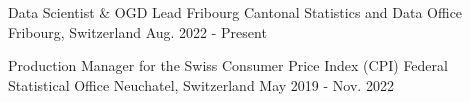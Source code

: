 
\begin{cventries}
  \cventry
    {Data Scientist \& OGD Lead}
    {Fribourg Cantonal Statistics and Data Office}
    {Fribourg, Switzerland}
    {Aug. 2022 - Present}
    {
      \begin{cvitems}
        \item {\ExpCurrentPortal}
        \item {\ExpCurrentPipeline}
        \item {\ExpCurrentGovernance}
        \item {\ExpCurrentLeadership}
      \end{cvitems}
    }

  \cventry
    {Production Manager for the Swiss Consumer Price Index (CPI)}
    {Federal Statistical Office}
    {Neuchatel, Switzerland}
    {May 2019 - Nov. 2022}
    {
      \begin{cvitems}
        \item {\ExpCpiProcessing}
        \item {\ExpCpiModeling}
        \item {\ExpCpiQuality}
        \item {\ExpCpiLeadership}
      \end{cvitems}
    }
\end{cventries}

